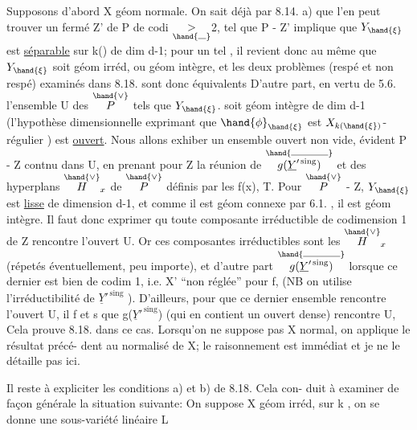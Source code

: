 


Supposons d'abord X géom normale. On sait déjà par 8.14. a)  que
l'en  peut trouver un fermé Z' de P de codi $\underset{\hand{\rule{0.7em}{0.35pt}}}{>}$2, tel que
\hand{$\xi\in$} P - Z'  implique que  $Y_{\hand{\xi}}$  est  \uline{séparable} sur k(\hand{$\xi$}) de  dim d-1; pour
un tel \hand{$\xi$} , il revient donc au même que $Y_{\hand{\xi}}$ soit géom irréd, ou géom
intègre, et  les deux problèmes  (respé et non respé) examinés dans
8.18. sont donc équivalents D'autre part, en vertu de 5.6. l'ensemble
U des \hand{$\xi\in$} $\overset{\hand{\vee}}{P}$  tels que  $Y_{\hand{\xi}}$.  soit géom intègre de dim d-1 (l'hypothèse
dimensionnelle exprimant que $\hand{\phi}_{\hand{\xi}}$ est $X_{k(\hand{\xi})}$-régulier ) est \uline{ouvert}.
Nous allons exhiber un ensemble ouvert non vide, évident  P - Z  contnu dans U,
en prenant pour  Z la réunion de  $\overset{\hand{\rule{3.3em}{0.35pt}}}{g(\underline{Y}'^{\,\mathrm{sing}})}$  et des hyperplans $\overset{\hand{\vee}}{H}_x$
de $\overset{\hand{\vee}}{P}$  définis par les  f(x),  T.  Pour \hand{$\xi\in$} $\overset{\hand{\vee}}{P}$ - Z,  $Y_{\hand{\xi}}$  est \uline{lisse}
de dimension d-1, et comme il est géom connexe par 6.1. , il est géom
intègre.  Il faut donc  exprimer qu toute composante irréductible
de codimension  1 de Z  rencontre l'ouvert U.  Or ces composantes
irréductibles sont les  $\overset{\hand{\vee}}{H}_x$  (répetés éventuellement, peu importe), et
d'autre part $\overset{\hand{\rule{3.3em}{0.35pt}}}{g(\underline{Y}'^{\,\mathrm{sing}})}$  lorsque  ce dernier  est bien de codim 1, i.e.
X' ``non réglée'' pour f, (NB on utilise l'irréductibilité de  $\underline{Y}'^{\,\mathrm{sing}}$ ).
D'ailleurs, pour que ce dernier ensemble rencontre  l'ouvert U,
il f et s  que  g($\underline{Y}'^{\,\mathrm{sing}}$)  (qui en contient un ouvert dense) rencontre
U,  Cela prouve 8.18. dans ce
cas.  Lorsqu'on ne suppose pas X normal, on applique le résultat précé-%
dent au normalisé de X; le raisonnement est immédiat et je ne le détaille
pas ici.  

Il reste à expliciter  les conditions a) et b) de 8.18. Cela con-%
duit à examiner de façon générale la situation suivante:  On suppose
X géom irréd, sur k , on se donne une sous-variété linéaire  L 

